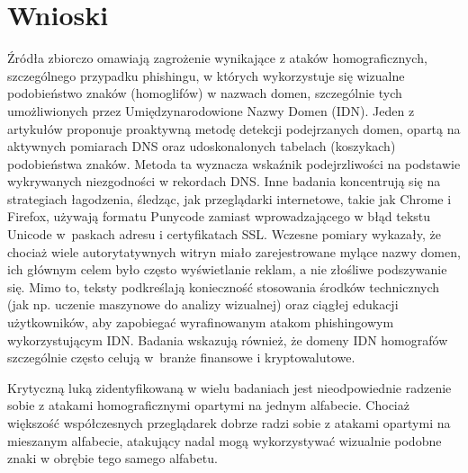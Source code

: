 \section{Wnioski}
Źródła zbiorczo omawiają zagrożenie wynikające z ataków homograficznych, szczególnego przypadku phishingu, w których wykorzystuje się wizualne podobieństwo znaków (homoglifów) w nazwach domen, szczególnie tych umożliwionych przez Umiędzynarodowione Nazwy Domen (IDN). Jeden z artykułów proponuje proaktywną metodę detekcji podejrzanych domen, opartą na aktywnych pomiarach DNS oraz udoskonalonych tabelach (koszykach) podobieństwa znaków. Metoda ta wyznacza wskaźnik podejrzliwości na podstawie wykrywanych niezgodności w rekordach DNS. Inne badania koncentrują się na strategiach łagodzenia, śledząc, jak przeglądarki internetowe, takie jak Chrome i Firefox, używają formatu Punycode zamiast wprowadzającego w błąd tekstu Unicode w~paskach adresu i certyfikatach SSL. Wczesne pomiary wykazały, że chociaż wiele autorytatywnych witryn miało zarejestrowane mylące nazwy domen, ich głównym celem było często wyświetlanie reklam, a nie złośliwe podszywanie się. Mimo to, teksty podkreślają konieczność stosowania środków technicznych (jak np. uczenie maszynowe do analizy wizualnej) oraz ciągłej edukacji użytkowników, aby zapobiegać wyrafinowanym atakom phishingowym wykorzystującym IDN. Badania wskazują również, że domeny IDN homografów szczególnie często celują w~branże finansowe i kryptowalutowe. 

Krytyczną luką zidentyfikowaną w wielu badaniach jest nieodpowiednie radzenie sobie z atakami homograficznymi opartymi na jednym alfabecie. Chociaż większość współczesnych przeglądarek dobrze radzi sobie z atakami opartymi na mieszanym alfabecie, atakujący nadal mogą wykorzystywać wizualnie podobne znaki w obrębie tego samego alfabetu.

